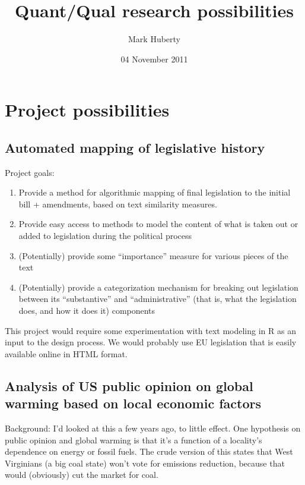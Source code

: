 \documentclass[11pt]{article}
\title{Quant/Qual research possibilities}
\author{Mark Huberty}
\date{04 November 2011}
\begin{document}
\maketitle

\setcounter{tocdepth}{3}
\tableofcontents
\vspace*{1cm}

\section{Project possibilities}
\label{sec-1}
\subsection{Automated mapping of legislative history}
\label{sec-1_1}

   Project goals: 
\begin{enumerate}
\item Provide a method for algorithmic mapping of final
      legislation to the initial bill + amendments, based on text
      similarity measures.
\item Provide easy access to methods to model the content of what is
      taken out or added to legislation during the political process
\item (Potentially) provide some ``importance'' measure for various
      pieces of the text
\item (Potentially) provide a categorization mechanism for breaking
      out legislation between its ``substantive'' and ``administrative''
      (that is, what the legislation does, and how it does it) components
\end{enumerate}


   This project would require some experimentation with text modeling
   in R as an input to the design process. We would probably use EU
   legislation that is easily available online in HTML format.
      
\subsection{Analysis of US public opinion on global warming based on local economic factors}
\label{sec-1_2}

   Background: I'd looked at this a few years ago, to little
   effect. One hypothesis on public opinion and global warming is that
   it's a function of a locality's dependence on energy or fossil
   fuels. The crude version of this states that West Virginians (a big
   coal state) won't vote for emissions reduction, because that would
   (obviously) cut the market for coal. 
\end{document}
